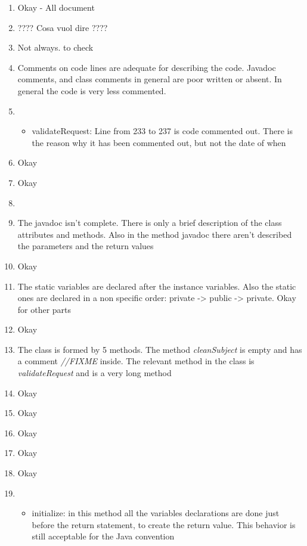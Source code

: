 \begin{enumerate}
\begin{itemize}
                \end{itemize}
        \item Okay - All document
        \item ???? Cosa vuol dire ????
        \item Not always. to check
        \item Comments on code lines are adequate for describing the code. Javadoc comments, and class comments in general are poor written or absent. In general the code is very less commented.
        \item   \begin{itemize}
                    \item validateRequest:  Line from 233 to 237 is code commented out. There is the reason why it has been commented out, but not the date of when
                \end{itemize}
        \item Okay
        \item Okay
        \item 
        \item The javadoc isn't complete. There is only a brief description of the class attributes and methods. Also in the method javadoc there aren't described the parameters and the return values
        \item Okay
        \item The static variables are declared after the instance variables. Also the static ones are declared in a non specific order: private -> public -> private. 
        Okay for other parts
        \item Okay
        \item The class is formed by 5 methods. The method \textit{cleanSubject} is empty and has a comment \textit{//FIXME} inside. The relevant method in the class is \textit{validateRequest} and is a very long method
        \item Okay
        \item Okay
        \item Okay
        \item Okay
        \item Okay
        \item 
            \begin{itemize}
                \item initialize: in this method all the variables declarations are done just before the return statement, to create the return value. This behavior is still acceptable for the Java convention

\end{itemize}
\end{enumerate}
